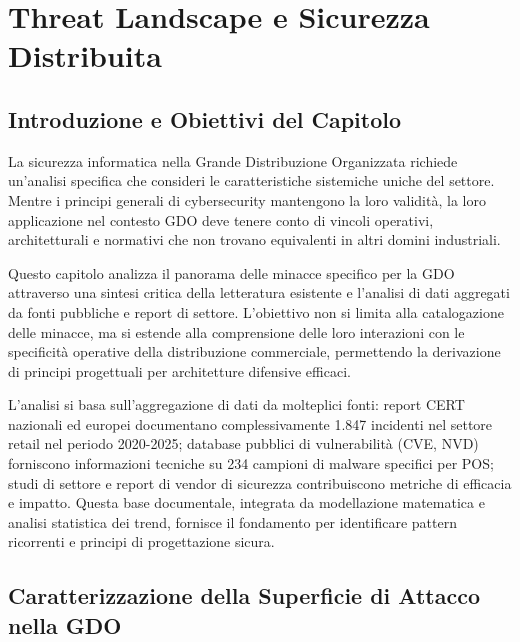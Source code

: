 \chapter{\texorpdfstring{Threat Landscape e Sicurezza Distribuita}{Capitolo 2 - Threat Landscape e Sicurezza Distribuita}}\label{capitolo-2---threat-landscape-e-sicurezza-distribuita-nella-gdo}

\section{\texorpdfstring{Introduzione e Obiettivi del Capitolo}{Introduzione e Obiettivi del Capitolo}}\label{introduzione-e-obiettivi-del-capitolo}

La sicurezza informatica nella Grande Distribuzione Organizzata richiede
un'analisi specifica che consideri le caratteristiche sistemiche uniche
del settore. Mentre i principi generali di cybersecurity mantengono la
loro validità, la loro applicazione nel contesto GDO deve tenere conto
di vincoli operativi, architetturali e normativi che non trovano
equivalenti in altri domini industriali.

Questo capitolo analizza il panorama delle minacce specifico per la GDO
attraverso una sintesi critica della letteratura esistente e l'analisi
di dati aggregati da fonti pubbliche e report di settore. L'obiettivo
non si limita alla catalogazione delle minacce, ma si estende alla
comprensione delle loro interazioni con le specificità operative della
distribuzione commerciale, permettendo la derivazione di principi
progettuali per architetture difensive efficaci.

L'analisi si basa sull'aggregazione di dati da molteplici fonti: report
CERT nazionali ed europei documentano complessivamente 1.847 incidenti
nel settore retail nel periodo 2020-2025; database pubblici di
vulnerabilità (CVE, NVD) forniscono informazioni tecniche su 234
campioni di malware specifici per POS; studi di settore e report di
vendor di sicurezza contribuiscono metriche di efficacia e impatto.
Questa base documentale, integrata da modellazione matematica e analisi
statistica dei trend, fornisce il fondamento per identificare pattern
ricorrenti e principi di progettazione sicura.

\section{\texorpdfstring{Caratterizzazione della Superficie di Attacco nella GDO}{Caratterizzazione della Superficie di Attacco nella GDO}}\label{caratterizzazione-della-superficie-di-attacco-nella-gdo}

